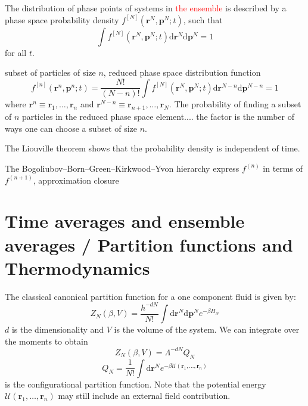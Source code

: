The distribution of phase points of systems in \textcolor{red}{the
ensemble} is described by a phase space probability density $f^{[N]}(\mathbf{r}^{N},\mathbf{p}^{N};t)$,
such that 
\begin{equation}
\int f^{[N]}(\mathbf{r}^{N},\mathbf{p}^{N};t)\mathrm{d}\mathbf{r}^{N}\mathrm{d}\mathbf{p}^{N}=1
\end{equation}
for all $t$.

subset of particles of size $n$, reduced phase space distribution
function 
\begin{equation}
f^{[n]}(\mathbf{r}^{n},\mathbf{p}^{n};t)=\dfrac{N!}{(N-n)!}\int f^{[N]}(\mathbf{r}^{N},\mathbf{p}^{N};t)\mathrm{d}\mathbf{r}^{N-n}\mathrm{d}\mathbf{p}^{N-n}=1
\end{equation}
where $\mathbf{r}^{n}\equiv\mathbf{r}_{1},\ldots,\mathbf{r}_{n}$
and $\mathbf{r}^{N-n}\equiv\mathbf{r}_{n+1},\ldots,\mathbf{r}_{N}$.
The probability of finding a subset of $n$ particles in the reduced
phase space element.... the factor is the number of ways one can choose
a subset of size $n$.

The Liouville theorem shows that the probability density is independent
of time.

The Bogoliubov–Born–Green–Kirkwood–Yvon hierarchy express $f^{(n)}$
in terms of $f^{(n+1)}$, approximation closure


\section{Time averages and ensemble averages / Partition functions and Thermodynamics}

The classical canonical partition function for a one component fluid
is given by:
\begin{equation}
Z_{N}(\beta,V)=\dfrac{h^{-dN}}{N!}\int\mathrm{d}\mathbf{r}^{N}\mathrm{d}\mathbf{p}^{N}e^{-\beta H_{N}}
\end{equation}
$d$ is the dimensionality and $V$ is the volume of the system. We
can integrate over the moments to obtain
\begin{equation}
Z_{N}(\beta,V)=\Lambda^{-dN}Q_{N}
\end{equation}
\begin{equation}
Q_{N}=\dfrac{1}{N!}\int\mathrm{d}\mathbf{r}^{N}e^{-\beta\mathcal{U}(\mathbf{r}_{1},\ldots,\mathbf{r}_{n})}
\end{equation}
is the configurational partition function. Note that the potential
energy $\mathcal{U}(\mathbf{r}_{1},\ldots,\mathbf{r}_{n})$ may still
include an external field contribution.

